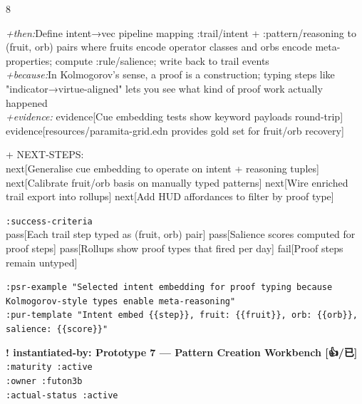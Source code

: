 \documentclass[landscape]{article}
\newcommand{\flexitag}[1]{\textcolor[gray]{0.35}{\textit{#1}}}
\newenvironment{devmapactive}{%
  \def\FrameCommand{\colorbox{devmapactivebg}}%
  \setlength{\fboxsep}{2pt}%
  \MakeFramed{\advance\hsize-\width \FrameRestore}%
}{\endMakeFramed}
\newenvironment{devmapgreenfield}{%
  \def\FrameCommand{\colorbox{devmapgreenfieldbg}}%
  \setlength{\fboxsep}{2pt}%
  \MakeFramed{\advance\hsize-\width \FrameRestore}%
}{\endMakeFramed}
\begin{document}
\begin{paracol}{8}
\begin{devmapgreenfield}
  \flexitag{+then:}Define intent→vec pipeline mapping :trail/intent + :pattern/reasoning to (fruit, orb) pairs where fruits encode operator classes and orbs encode meta-properties; compute :rule/salience; write back to trail events\\
  \flexitag{+because:}In Kolmogorov’s sense, a proof is a construction; typing steps like "indicator→virtue-aligned" lets you see what kind of proof work actually happened\\
  \flexitag{+evidence:} evidence[Cue embedding tests show keyword payloads round-trip] evidence[resources/paramita-grid.edn provides gold set for fruit/orb recovery]\\
\par
  + NEXT-STEPS:\\
    next[Generalise cue embedding to operate on intent + reasoning tuples] next[Calibrate fruit/orb basis on manually typed patterns] next[Wire enriched trail export into rollups] next[Add HUD affordances to filter by proof type]\\
\par
  \texttt{:\allowbreak{}success-\allowbreak{}criteria}\\
    pass[Each trail step typed as (fruit, orb) pair] pass[Salience scores computed for proof steps] pass[Rollups show proof types that fired per day] fail[Proof steps remain untyped]\\
\par
  \texttt{:\allowbreak{}psr-\allowbreak{}example "Selected intent embedding for proof typing because Kolmogorov-\allowbreak{}style types enable meta-\allowbreak{}reasoning"}\\
  \texttt{:\allowbreak{}pur-\allowbreak{}template "Intent embed \{\{step\}\},\allowbreak{} fruit:\allowbreak{} \{\{fruit\}\},\allowbreak{} orb:\allowbreak{} \{\{orb\}\},\allowbreak{} salience:\allowbreak{} \{\{score\}\}"}\\
\par
\par
\end{devmapgreenfield}
\begin{devmapactive}
\textbf{! instantiated-by: Prototype 7 — Pattern Creation Workbench [👍/已]}\\
  \texttt{:\allowbreak{}maturity :\allowbreak{}active}\\
  \texttt{:\allowbreak{}owner :\allowbreak{}futon3b}\\
  \texttt{:\allowbreak{}actual-\allowbreak{}status :\allowbreak{}active}\\

\end{devmapactive}
\end{paracol}
\end{document}
